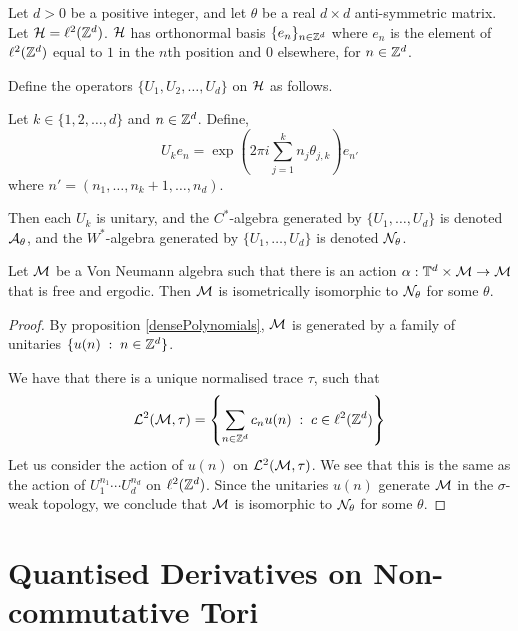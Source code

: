 \begin{definition}
    Let $d > 0$ be a positive integer, and let $\theta$ be a
    real $d\times d$ anti-symmetric matrix. Let $\mathcal{H} = \ell^2(\mathbb{Z}^d)$.
    $\mathcal{H}$ has orthonormal basis $\{e_n\}_{n \in \mathbb{Z}^d}$
    where $e_n$ is the element of $\ell^2(\mathbb{Z}^d)$ equal to $1$
    in the $n$th position and $0$ elsewhere, for $n \in \mathbb{Z}^d$. 
    
     Define
    the operators $\{U_1,U_2,\ldots,U_d\}$ on $\mathcal{H}$ as follows.
    
    Let $k \in \{1,2,\ldots,d\}$ and $n \in \mathbb{Z}^d$. Define,
    \begin{equation*}
        U_k e_n = \exp\left(2\pi i \sum_{j=1}^k n_j\theta_{j,k}\right)e_{n'}
    \end{equation*} 
    where $n' = (n_1,\ldots,n_k+1,\ldots,n_d)$.
    
    Then each $U_k$ is unitary, and the $C^*$-algebra
    generated by $\{U_1,\ldots,U_d\}$ is denoted $\mathcal{A}_\theta$,
    and the $W^*$-algebra generated by $\{U_1,\ldots,U_d\}$ is denoted
    $\mathcal{N}_\theta$.
\end{definition}


\begin{proposition}
    Let $\mathcal{M}$ be a Von Neumann algebra such that there is an action
    $\alpha:\mathbb{T}^d\times \mathcal{M}\to\mathcal{M}$ that is free and ergodic. Then $\mathcal{M}$
    is isometrically isomorphic to $\mathcal{N}_\theta$ for some $\theta$.
\end{proposition}
\begin{proof}
    By proposition \ref{densePolynomials}, $\mathcal{M}$ is generated
    by a family of unitaries $\{u(n)\;:\;n \in \mathbb{Z}^d\}$.
    
    We have that there is a unique normalised trace $\tau$, such that
    \begin{equation}
        \mathcal{L}^2(\mathcal{M},\tau) = \left\{\sum_{n \in \mathbb{Z}^d} c_nu(n)\;:\; c \in \ell^2(\mathbb{Z}^d)\right\}
    \end{equation}
    Let us consider the action of $u(n)$ on $\mathcal{L}^2(\mathcal{M},\tau)$. We
    see that this is the same as the action of $U_1^{n_1}\cdots U_d^{n_d}$
    on $\ell^2(\mathbb{Z}^d)$. Since the unitaries $u(n)$ generate $\mathcal{M}$ 
    in the $\sigma$-weak topology, we conclude that $\mathcal{M}$
    is isomorphic to $\mathcal{N}_\theta$ for some $\theta$.
\end{proof}

\section{Quantised Derivatives on Non-commutative Tori}


